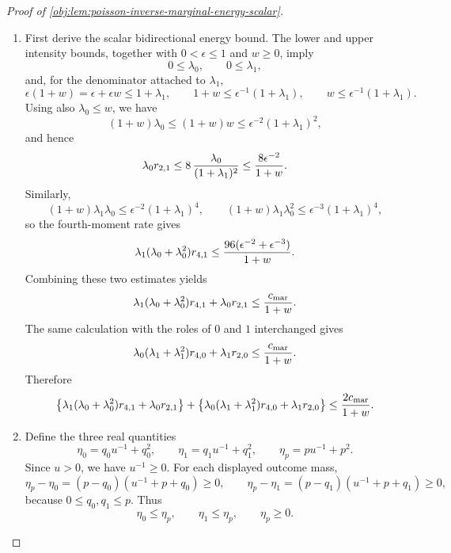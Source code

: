 \begin{proof}[Proof of \cref{obj:lem:poisson-inverse-marginal-energy-scalar}]
\begin{enumerate}
\item First derive the scalar bidirectional energy bound.  The lower and upper intensity bounds, together with \(0<\epsilon\le1\) and \(w\ge0\), imply
\[
0\le \lambda_0,\qquad 0\le \lambda_1,
\]
and, for the denominator attached to \(\lambda_1\),
\[
\epsilon(1+w)=\epsilon+\epsilon w\le 1+\lambda_1,
\qquad
1+w\le \epsilon^{-1}(1+\lambda_1),
\qquad
w\le \epsilon^{-1}(1+\lambda_1).
\]
Using also \(\lambda_0\le w\), we have
\[
(1+w)\lambda_0
   \le (1+w)w
   \le \epsilon^{-2}(1+\lambda_1)^2,
\]
and hence
\[
\lambda_0 r_{2,1}
   \le 8\,{\lambda_0\over (1+\lambda_1)^2}
   \le {8\epsilon^{-2}\over 1+w}.
\]
Similarly,
\[
(1+w)\lambda_1\lambda_0
 \le \epsilon^{-2}(1+\lambda_1)^4,
\qquad
(1+w)\lambda_1\lambda_0^2
 \le \epsilon^{-3}(1+\lambda_1)^4,
\]
so the fourth-moment rate gives
\[
\lambda_1(\lambda_0+\lambda_0^2)r_{4,1}
 \le
 {96(\epsilon^{-2}+\epsilon^{-3})\over 1+w}.
\]
Combining these two estimates yields
\[
\lambda_1(\lambda_0+\lambda_0^2)r_{4,1}
 +\lambda_0 r_{2,1}
 \le {c_{\mathrm{mar}}\over 1+w}.
\]
The same calculation with the roles of \(0\) and \(1\) interchanged gives
\[
\lambda_0(\lambda_1+\lambda_1^2)r_{4,0}
 +\lambda_1 r_{2,0}
 \le {c_{\mathrm{mar}}\over 1+w}.
\]
Therefore
\[
\bigl\{\lambda_1(\lambda_0+\lambda_0^2)r_{4,1}
 +\lambda_0 r_{2,1}\bigr\}
+
\bigl\{\lambda_0(\lambda_1+\lambda_1^2)r_{4,0}
 +\lambda_1 r_{2,0}\bigr\}
\le {2c_{\mathrm{mar}}\over 1+w}.
\]

\item Define the three real quantities
\[
\eta_0=q_0u^{-1}+q_0^2,\qquad
\eta_1=q_1u^{-1}+q_1^2,\qquad
\eta_p=pu^{-1}+p^2 .
\]
Since \(u>0\), we have \(u^{-1}\ge0\).  For each displayed outcome mass,
\[
\eta_p-\eta_0
  =(p-q_0)(u^{-1}+p+q_0)\ge0,
\qquad
\eta_p-\eta_1
  =(p-q_1)(u^{-1}+p+q_1)\ge0,
\]
because \(0\le q_0,q_1\le p\).  Thus
\[
\eta_0\le \eta_p,\qquad \eta_1\le \eta_p,
\qquad \eta_p\ge0.
\]


\end{enumerate}
\end{proof}
